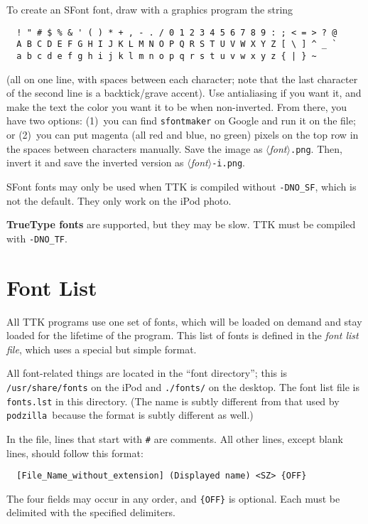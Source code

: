 \documentclass[12pt,letterpaper]{report}
\def\pz{\texttt{podzilla}}
\let\ttt\tt
\def\tt{\def\_{{\ttt\char`\_}}\ttt}
\def\texttt#1{{\tt #1}}
\def\<#1>{\leavevmode\hbox{$\langle${\sl#1\/}$\rangle$}}
\begin{document}
To create an SFont font, draw with a graphics program the string
\begin{verbatim}
  ! " # $ % & ' ( ) * + , - . / 0 1 2 3 4 5 6 7 8 9 : ; < = > ? @
  A B C D E F G H I J K L M N O P Q R S T U V W X Y Z [ \ ] ^ _ `
  a b c d e f g h i j k l m n o p q r s t u v w x y z { | } ~
\end{verbatim}
\begin{comment}
$
\end{comment}
(all on one line, with spaces between each character; note that the last
character of the second line is a backtick/grave accent). Use antialiasing if you want it, and make
the text the color you want it to be when non-inverted.
From there, you have two options: (1)~you can find {\tt sfontmaker} on Google and run it on the file; or (2)~you
can put magenta (all red and blue, no green) pixels on the top row in the spaces between characters manually.
Save the image as \<font>\verb|.png|. Then, invert it and save the inverted version as \<font>\verb|-i.png|.

SFont fonts may only be used when TTK is compiled without {\tt -DNO_SF}, which is not the default. They only
work on the iPod photo.

{\bf TrueType fonts} are supported, but they may be slow. TTK must be compiled with {\tt -DNO_TF}.

\section{Font List}
All TTK programs use one set of fonts, which will be loaded on demand and stay loaded for the lifetime
of the program. This list of fonts is defined in the {\sl font list file}, which uses a special but simple
format.

All font-related things are located in the ``font directory''; this is \verb|/usr/share/fonts| on the iPod
and \verb|./fonts/| on the desktop. The font list file is \verb|fonts.lst| in this directory. (The name
is subtly different from that used by \pz\ because the format is subtly different as well.)

In the file, lines that start with {\tt \#} are comments. All other lines, except blank lines, should
follow this format:
\begin{verbatim}
  [File_Name_without_extension] (Displayed name) <SZ> {OFF}
\end{verbatim}
The four fields may occur in any order, and \verb|{OFF}| is optional. Each must be delimited with the
specified delimiters.
\end{document}
